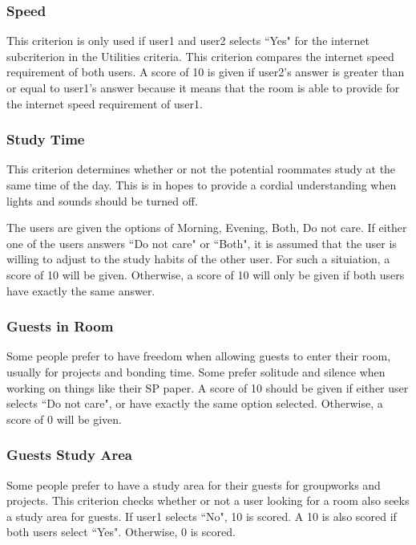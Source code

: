 \documentclass[journal]{IEEEtran}
\begin{document}
    \subsubsection{Speed}
        This criterion is only used if user1 and user2 selects ``Yes" for the internet subcriterion in the
        Utilities criteria. This criterion compares the internet speed requirement of both users. A score of 10 is
        given if user2's answer is greater than or equal to user1's answer because it means that the room is able to
        provide for the internet speed requirement of user1.

    \subsubsection{Study Time}
        This criterion determines whether or not the potential roommates study at the same time of the day. This is in
        hopes to provide a cordial understanding when lights and sounds should be turned off.

        The users are given the options of Morning, Evening, Both, Do not care. If either one of the users answers ``Do
        not care" or ``Both", it is assumed that the user is willing to adjust to the study habits of the other user. For such a
        situiation, a score of 10 will be given. Otherwise, a score of 10 will only be given if both users have exactly
        the same answer.

    \subsubsection{Guests in Room}
        Some people prefer to have freedom when allowing guests to enter their room, usually for projects and bonding
        time. Some prefer solitude and silence when working on things like their SP paper. A score of 10 should be given
        if either user selects ``Do not care", or have exactly the same option selected. Otherwise, a score of 0 will be
        given.

    \subsubsection{Guests Study Area}
        Some people prefer to have a study area for their guests for groupworks and projects. This criterion checks
        whether or not a user looking for a room also seeks a study area for guests. If user1 selects ``No", 10 is
        scored. A 10 is also scored if both users select ``Yes". Otherwise, 0 is scored.
\end{document}
